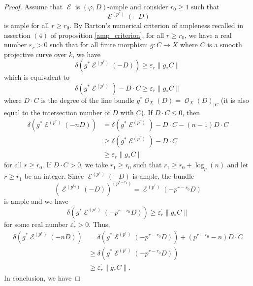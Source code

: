 \documentclass[11pt]{amsart}
\numberwithin{subsection}{section}
\numberwithin{figure}{section}
\numberwithin{table}{section}
\theoremstyle{1}
\theoremstyle{2}
\DeclareMathOperator{\E}{\mathcal{E}}
\DeclareMathOperator{\Oc}{\mathcal{O}}
\begin{document}
\begin{proof}
Assume that $\E$ is $(\varphi,D)$-ample and consider $r_0 \geq 1$ such that $$\E^{(p^r)}(-D)$$ is ample for all $r \geq r_0$. By Barton's numerical criterion of ampleness recalled in assertion $(4)$ of proposition \ref{amp_criterion}, for all $r \geq r_0$, we have a real number $\varepsilon_r > 0$ such that for all finite morphism $g : C \rightarrow X$ where $C$ is a smooth projective curve over $k$, we have
\begin{equation*}
\delta(g^*\E^{(p^r)}(-D)) \geq \varepsilon_r\lVert g_*C \rVert
\end{equation*} 
which is equivalent to
\begin{equation*}
\delta(g^*\E^{(p^r)}) -D\cdot C \geq \varepsilon_r\lVert g_*C \rVert
\end{equation*}
where $D\cdot C$ is the degree of the line bundle $g^*\Oc_X(D) = \Oc_X(D)_{|C}$ (it is also equal to the intersection number of $D$ with $C$). If $D\cdot C\leq 0$, then 
\begin{equation*}
\begin{aligned}
\delta(g^*\E^{(p^r)}(-nD)) &= \delta(g^*\E^{(p^r)})-D\cdot C - (n-1)D\cdot C \\
&\geq \delta(g^*\E^{(p^r)})-D\cdot C \\
&\geq \varepsilon_r\lVert g_*C \rVert
\end{aligned}
\end{equation*}
for all $r\geq r_0$. If $D\cdot C > 0$, we take $r_1 \geq r_0$ such that $r_1 \geq r_0 + \log_p(n)$ and let $r\geq r_1$ be an integer. Since $\E^{(p^r)}(-D)$ is ample, the bundle 
\begin{equation*}
(\E^{(p^{r_0})}(-D))^{(p^{r-r_0})} = \E^{(p^r)}(-p^{r-r_0}D)
\end{equation*}
is ample and we have
\begin{equation*}
\delta(g^*\E^{(p^r)}(-p^{r-r_0}D)) \geq \varepsilon_r^\prime \lVert g_*C \rVert
\end{equation*}
for some real number $\varepsilon_r^\prime > 0$. Thus,
\begin{equation*}
\begin{aligned}
\delta(g^*\E^{(p^r)}(-nD)) &= \delta(g^*\E^{(p^r)}(-p^{r-r_0}D)) +(p^{r-r_0}-n)D\cdot C \\
&\geq  \delta(g^*\E^{(p^r)}(-p^{r-r_0}D)) \\
&\geq \varepsilon_r^\prime \lVert g_*C \rVert.
\end{aligned}
\end{equation*}
In conclusion, we have

\end{proof}
\end{document}
